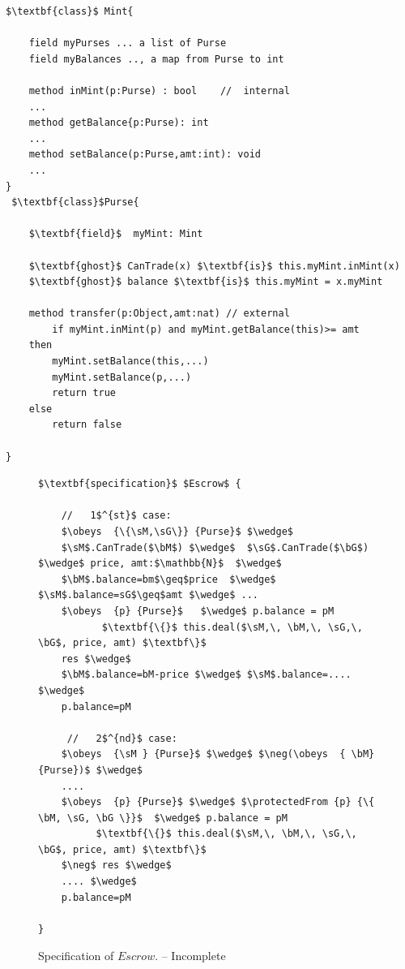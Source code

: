\begin{lstlisting}[mathescape=true, language=Chainmail, frame=lines]
 $\textbf{class}$ Mint{

	field myPurses ... a list of Purse
	field myBalances .., a map from Purse to int
	
	method inMint(p:Purse) : bool    //  internal
	...	
	method getBalance{p:Purse): int
	...
	method setBalance(p:Purse,amt:int): void
	...	
}
 $\textbf{class}$Purse{
    
    $\textbf{field}$  myMint: Mint
     
    $\textbf{ghost}$ CanTrade(x) $\textbf{is}$ this.myMint.inMint(x)
    $\textbf{ghost}$ balance $\textbf{is}$ this.myMint = x.myMint
    
    method transfer(p:Object,amt:nat) // external 
    	if myMint.inMint(p) and myMint.getBalance(this)>= amt 
	then
		myMint.setBalance(this,...)
		myMint.setBalance(p,...)
		return true
	else
		return false	
  
}
\end{lstlisting}



\begin{figure}[t]
\begin{lstlisting}[mathescape=true, language=Chainmail, frame=lines]
$\textbf{specification}$ $Escrow$ {
    
    //   1$^{st}$ case:
    $\obeys  {\{\sM,\sG\}} {Purse}$ $\wedge$ 
    $\sM$.CanTrade($\bM$) $\wedge$  $\sG$.CanTrade($\bG$)  $\wedge$ price, amt:$\mathbb{N}$  $\wedge$
    $\bM$.balance=bm$\geq$price  $\wedge$  $\sM$.balance=sG$\geq$amt $\wedge$ ...
    $\obeys  {p} {Purse}$   $\wedge$ p.balance = pM
           $\textbf{\{}$ this.deal($\sM,\, \bM,\, \sG,\, \bG$, price, amt) $\textbf\}$
    res $\wedge$
    $\bM$.balance=bM-price $\wedge$ $\sM$.balance=....  $\wedge$
    p.balance=pM

     //   2$^{nd}$ case:
    $\obeys  {\sM } {Purse}$ $\wedge$ $\neg(\obeys  { \bM} {Purse})$ $\wedge$ 
    ....
    $\obeys  {p} {Purse}$ $\wedge$ $\protectedFrom {p} {\{ \bM, \sG, \bG \}}$  $\wedge$ p.balance = pM
          $\textbf{\{}$ this.deal($\sM,\, \bM,\, \sG,\, \bG$, price, amt) $\textbf\}$
    $\neg$ res $\wedge$
    .... $\wedge$
    p.balance=pM
     
}

\end{lstlisting}
\caption{Specification of  $Escrow$. -- Incomplete}
\label{fig:EscrowSpec}
 \end{figure}
 
 
